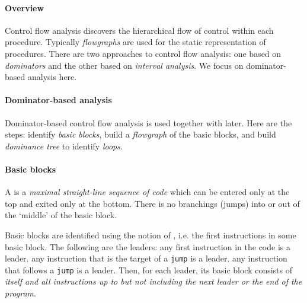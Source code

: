 \documentclass{memo}
\begin{document}
\small
{}

\paragraph{Overview} Control flow analysis discovers the hierarchical flow of
control within each procedure. Typically {\em flowgraphs\/} are used for
the static representation of procedures. There are two approaches to control
flow analysis: one based on {\em dominators\/} and the other based on {\em
  interval analysis\/}. We focus on dominator-based analysis here.

\paragraph{Dominator-based analysis} Dominator-based control flow analysis is
used together with  later. Here are the steps:
\ben
\w [1)] identify {\em basic blocks}, 
\w [2)] build a {\em flowgraph} of the basic blocks, and 
\w [3)] build {\em dominance tree} to identify {\em loops}.
\een



\paragraph{Basic blocks}
A  is a {\em maximal straight-line sequence of code\/}
   which can be entered only at the top and exited only at the bottom. There
   is no branchings (jumps) into or out of the `middle' of the basic block.

Basic blocks are identified using the notion of , i.e. the first
instructions in some basic block. The following are the leaders:
\bit
\w any first instruction in the code is a leader.
\w any instruction that is the target of a {\tt jump} is a leader.
\w any instruction that follows a {\tt jump} is a leader.
\eit
Then, for each leader, its basic block consists of {\em itself and all
  instructions up to but not including the next leader or the end of the
  program\/}. 
\end{document}
